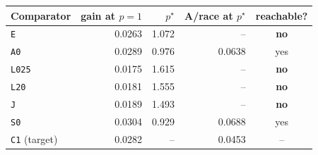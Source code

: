 \begin{tabular}{@{}lrrrc@{}}
\toprule
Comparator & gain at $p{=}1$ & $p^\star$ & A/race at $p^\star$ & reachable? \\
\midrule
\texttt{E} & 0.0263 & 1.072 & -- & \textbf{no} \\
\texttt{A0} & 0.0289 & 0.976 & 0.0638 & yes \\
\texttt{L025} & 0.0175 & 1.615 & -- & \textbf{no} \\
\texttt{L20} & 0.0181 & 1.555 & -- & \textbf{no} \\
\texttt{J} & 0.0189 & 1.493 & -- & \textbf{no} \\
\texttt{S0} & 0.0304 & 0.929 & 0.0688 & yes \\
\midrule
\texttt{C1} (target) & 0.0282 & -- & 0.0453 & -- \\
\bottomrule
\end{tabular}
